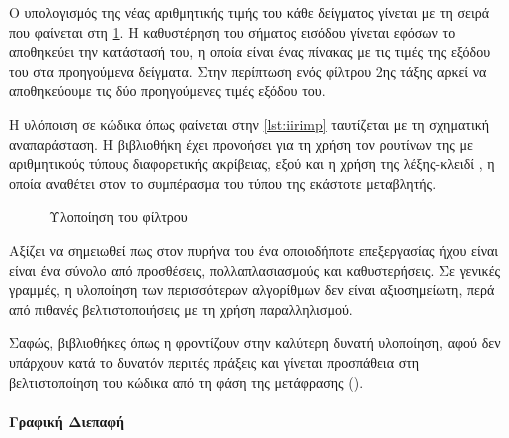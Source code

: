 \documentclass[12pt]{extarticle}
\begin{document}
Ο υπολογισμός της νέας αριθμητικής τιμής του κάθε δείγματος γίνεται με 
τη σειρά που φαίνεται στη \cref{fig:iir_filter_block}. 
Η καθυστέρηση του σήματος εισόδου γίνεται εφόσων το 
αποθηκεύει την κατάστασή του, η οποία είναι ένας πίνακας με τις τιμές της εξόδου 
του στα προηγούμενα δείγματα. Στην περίπτωση ενός φίλτρου 2ης τάξης 
αρκεί να αποθηκεύουμε τις δύο προηγούμενες τιμές εξόδου του.

Η υλόποιση σε κώδικα όπως φαίνεται στην \cref{lst:iirimp} ταυτίζεται με τη σχηματική 
αναπαράσταση. Η βιβλιοθήκη  έχει προνοήσει για τη χρήση τον ρουτίνων 
της με αριθμητικούς τύπους διαφορετικής ακρίβειας, εξού και η χρήση της 
λέξης-κλειδί  \cite{CppReferenceAuto}, η οποία αναθέτει στον  το συμπέρασμα του τύπου 
της εκάστοτε μεταβλητής.

\vspace{5mm}

\begin{figure}
\centering
    
\caption{Υλοποίηση του  φίλτρου}
\label{fig:iir_filter_block}

\end{figure}

\begin{minipage}{\textwidth}
\end{minipage}

Αξίζει να σημειωθεί πως στον πυρήνα του ένα οποιοδήποτε  επεξεργασίας 
ήχου είναι είναι ένα σύνολο από προσθέσεις, πολλαπλασιασμούς και καθυστερήσεις. 
Σε γενικές γραμμές, η υλοποίηση των περισσότερων 
αλγορίθμων δεν είναι αξιοσημείωτη, περά από πιθανές βελτιστοποιήσεις με τη χρήση παραλληλισμού. 

Σαφώς, βιβλιοθήκες όπως η  φροντίζουν στην καλύτερη δυνατή υλοποίηση, 
αφού δεν υπάρχουν κατά το δυνατόν περιτές πράξεις και γίνεται προσπάθεια 
στη βελτιστοποίηση του κώδικα από τη φάση της μετάφρασης ().

\paragraph{Γραφική Διεπαφή}

\epigraph{}{}
\end{document}
